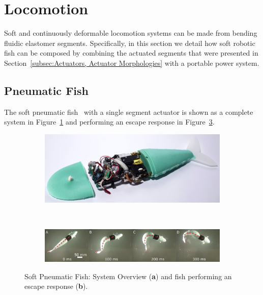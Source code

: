 \section{Locomotion}
\label{sec:Locomotion}
Soft and continuously deformable locomotion systems can be made from bending fluidic elastomer segments.
Specifically, in this section we detail how soft robotic fish can be composed by combining the actuated segments that were presented in Section~\ref{subsec:Actuators, Actuator Morphologies} with a portable power system.

\subsection{Pneumatic Fish}
\label{subsec:Locomotion, Pneumatic Fish}
The soft pneumatic fish~\cite{marchese2014autonomous} with a single segment actuator is shown as a complete system in Figure~\ref{fig:pneumaticfish_system} and performing an escape response in Figure~\ref{fig:pneumaticfish_escape}.

\begin{figure}[htb]
        \centering
        \begin{subfigure}[b]{\columnwidth}
            \centering
            \includegraphics[width=0.9\columnwidth]{Figures/locomotion/pneumaticfish_system.png}
            \caption{}
            \label{fig:pneumaticfish_system}
        \end{subfigure}\\
        \begin{subfigure}[b]{\columnwidth}
            \centering
            \includegraphics[width=0.9\columnwidth]{Figures/locomotion/pneumaticfish_escape_half.pdf}
            \caption{}
            \label{fig:pneumaticfish_escape}
        \end{subfigure}%
        \caption[Pneumatic Fish.]{Soft Pneumatic Fish: System Overview (\textbf{a}) and fish performing an escape response (\textbf{b}).}
\end{figure}



